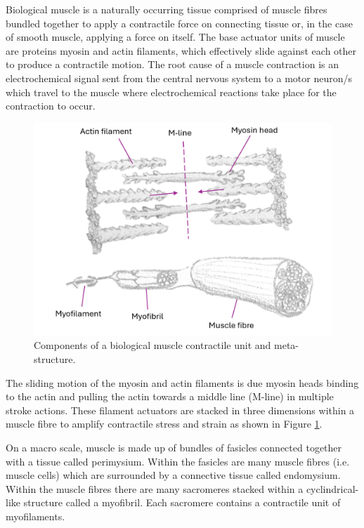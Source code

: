 Biological muscle is a naturally occurring tissue comprised of muscle fibres bundled together to apply a contractile force on connecting tissue or, in the case of smooth muscle, applying a force on itself. The base actuator units of muscle are proteins myosin and actin filaments, which effectively slide against each other to produce a contractile motion. The root cause of a muscle contraction is an electrochemical signal sent from the central nervous system to a motor neuron/s which travel to the muscle where electrochemical reactions take place for the contraction to occur\cite{Keynes2011}.
\begin{figure}[h!]
	\centering
	\includegraphics[width=0.6\linewidth]{Figures/motor-unit-myo-fibril-to-fibre.png}
	\caption{Components of a biological muscle contractile unit and meta-structure.}
	\label{fig:muscle_units}
\end{figure}
The sliding motion of the myosin and actin filaments is due myosin heads binding to the actin and pulling the actin towards a middle line (M-line) in multiple stroke actions. These filament actuators are stacked in three dimensions within a muscle fibre to amplify contractile stress and strain as shown in Figure \ref{fig:muscle_units}.

On a macro scale, muscle is made up of bundles of fasicles connected together with a tissue called perimysium. Within the fasicles are many muscle fibres (i.e. muscle cells) which are surrounded by a connective tissue called endomysium. Within the muscle fibres there are many sacromeres stacked within a cyclindrical-like structure called a myofibril. Each sacromere contains a contractile unit of myofilaments. 



